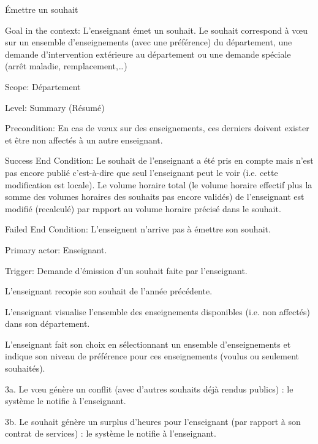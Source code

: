 \begin{ocl}
\begin{usecase}{\'Emettre un souhait}\label{usecase:souhait}
\begin{information}

\item [{Goal in the context:}]
 L'enseignant émet un souhait. Le souhait correspond à vœu sur un ensemble d'enseignements (avec une préférence) du département, une demande d'intervention extérieure au département ou une demande spéciale (arrêt maladie, remplacement,\dots)

\item[Scope:] Département

\item [{Level:}] Summary (Résumé)

\item[{Precondition:}]
 En cas de vœux sur des enseignements, ces derniers doivent exister et être non affectés à un autre enseignant.

\item[{Success End Condition:}]
 Le souhait de l'enseignant a été pris en compte mais n'est pas encore publié c'est-à-dire que seul l'enseignant peut le voir (i.e. cette modification est locale). 
Le volume horaire total (le volume horaire effectif plus la somme des volumes horaires des souhaits pas encore validés) de l'enseignant est modifié (recalculé) par rapport au volume horaire précisé dans le souhait.

\item[{Failed End Condition:}] L'enseignent n'arrive pas à émettre son souhait.
\item[{Primary actor:}] Enseignant.
\item[{Trigger:}] Demande d'émission d'un souhait faite par l'enseignant.
\end{information}

 \begin{scenario}
	 \item L'enseignant recopie son souhait de l'année précédente.
	 \item L'enseignant visualise l'ensemble des enseignements disponibles (i.e. non affectés) dans son département.
	 \item L'enseignant fait son choix en sélectionnant un ensemble d'enseignements et indique son niveau de préférence pour ces enseignements (voulus ou seulement souhaités).
 \end{scenario}


\begin{extension}
 \item [3a.] Le vœu génère un conflit (avec d'autres souhaits déjà rendus publics) : le système le notifie à l'enseignant.
 \item [3b.] Le souhait génère un surplus d'heures pour l'enseignant (par rapport à son contrat de services) : le système le notifie à l'enseignant.
\end{extension}



\end{usecase}
\end{ocl}

